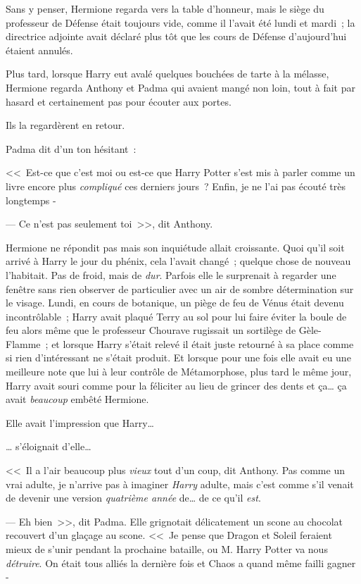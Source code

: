 Sans y penser, Hermione regarda vers la table d'honneur, mais le siège du professeur de Défense était toujours vide, comme il l'avait été lundi et mardi~; la directrice adjointe avait déclaré plus tôt que les cours de Défense d'aujourd'hui étaient annulés.

Plus tard, lorsque Harry eut avalé quelques bouchées de tarte à la mélasse, Hermione regarda Anthony et Padma qui avaient mangé non loin, tout à fait par hasard et certainement pas pour écouter aux portes.

Ils la regardèrent en retour.

Padma dit d'un ton hésitant~:

<<~Est-ce que c'est moi ou est-ce que Harry Potter s'est mis à parler comme un livre encore plus \emph{compliqué} ces derniers jours~? Enfin, je ne l'ai pas écouté très longtemps -

--- Ce n'est pas seulement toi~>>, dit Anthony.

Hermione ne répondit pas mais son inquiétude allait croissante. Quoi qu'il soit arrivé à Harry le jour du phénix, cela l'avait changé~; quelque chose de nouveau l'habitait. Pas de froid, mais de \emph{dur}. Parfois elle le surprenait à regarder une fenêtre sans rien observer de particulier avec un air de sombre détermination sur le visage. Lundi, en cours de botanique, un piège de feu de Vénus était devenu incontrôlable~; Harry avait plaqué Terry au sol pour lui faire éviter la boule de feu alors même que le professeur Chourave rugissait un sortilège de Gèle-Flamme~; et lorsque Harry s'était relevé il était juste retourné à sa place comme si rien d'intéressant ne s'était produit. Et lorsque pour une fois elle avait eu une meilleure note que lui à leur contrôle de Métamorphose, plus tard le même jour, Harry avait souri comme pour la féliciter au lieu de grincer des dents et ça… ça avait \emph{beaucoup} embêté Hermione.

Elle avait l'impression que Harry…

… s'éloignait d'elle…

<<~Il a l'air beaucoup plus \emph{vieux} tout d'un coup, dit Anthony. Pas comme un vrai adulte, je n'arrive pas à imaginer \emph{Harry} adulte, mais c'est comme s'il venait de devenir une version \emph{quatrième année} de… de ce qu'il \emph{est}.

--- Eh bien~>>, dit Padma. Elle grignotait délicatement un scone au chocolat recouvert d'un glaçage au scone. <<~Je pense que Dragon et Soleil feraient mieux de s'unir pendant la prochaine bataille, ou M. Harry Potter va nous \emph{détruire}. On était tous alliés la dernière fois et Chaos a quand même failli gagner -

